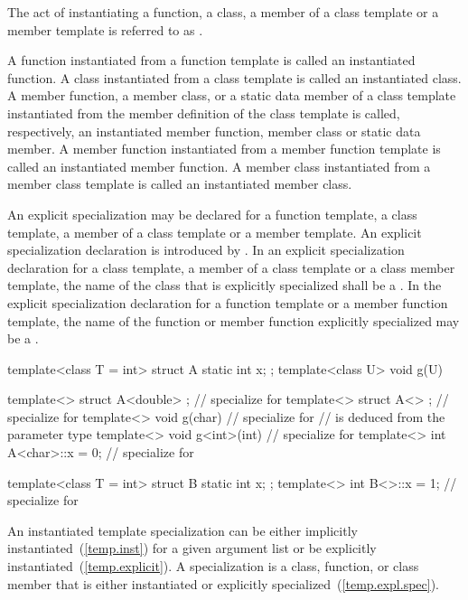 \pnum
{}%
The act of instantiating a function, a class, a member of a class template or
a member template is referred to as
.

\pnum
A function instantiated from a function template is called an instantiated
function.
A class instantiated from a class template is called an instantiated class.
A member function, a member class, or a static data member of a class template
instantiated from the member definition of the class template is called,
respectively, an instantiated member function, member class or static data
member.
A member function instantiated from a member function template is called an
instantiated member function.
A member class instantiated from a member class template is called an
instantiated member class.

\pnum
An explicit specialization may be declared for a function template,
a class template, a member of a class template or a member template.
An explicit specialization declaration is introduced by
.
In an explicit specialization declaration for a class template,
a member of a class template or a class member template,
the name of the class that is explicitly specialized shall be a
.
In the explicit specialization declaration for a function template or
a member function template,
the name of the function or member function explicitly specialized may be a
.
\enterexample

\begin{codeblock}
template<class T = int> struct A {
	static int x;
};
template<class U> void g(U) { }

template<> struct A<double> { };        // specialize for 
template<> struct A<> { };              // specialize for 
template<> void g(char) { }             // specialize for 
                                        //  is deduced from the parameter type
template<> void g<int>(int) { }         // specialize for 
template<> int A<char>::x = 0;          // specialize for 

template<class T = int> struct B {
	static int x;
};
template<> int B<>::x = 1;              // specialize for 
\end{codeblock}
\exitexampleb

\pnum
An instantiated template specialization can be either implicitly
instantiated~(\ref{temp.inst}) for a given argument list or be explicitly
instantiated~(\ref{temp.explicit}).
A specialization is a class, function, or class member that is either
instantiated or explicitly specialized~(\ref{temp.expl.spec}).

